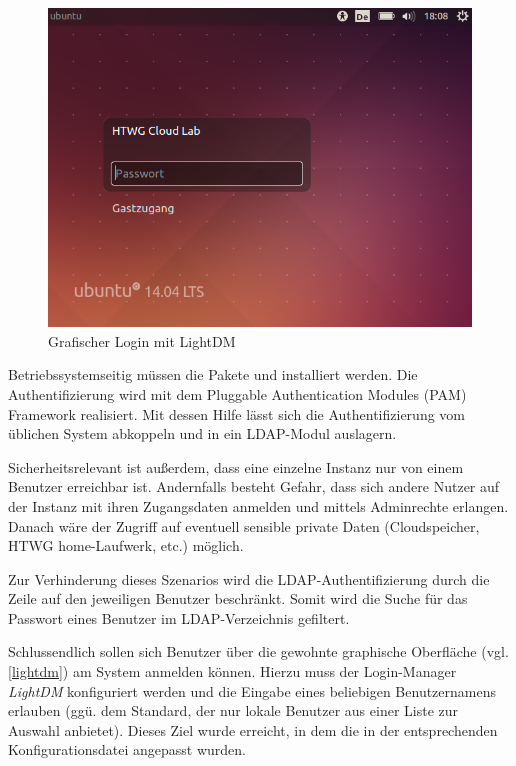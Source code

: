 \begin{figure}[htbp]
\centering
\includegraphics[scale=0.6]{img/lightdm.png}
\caption{Grafischer Login mit LightDM}
\label{lightdm}
\end{figure}

Betriebssystemseitig müssen die Pakete  und  installiert werden. 
Die Authentifizierung wird mit dem Pluggable Authentication Modules (PAM) Framework realisiert. 
Mit dessen Hilfe lässt sich die Authentifizierung vom üblichen System abkoppeln und in ein LDAP-Modul auslagern.

Sicherheitsrelevant ist außerdem, dass eine einzelne Instanz nur von einem Benutzer erreichbar ist. 
Andernfalls besteht Gefahr, dass sich andere Nutzer auf der Instanz mit ihren Zugangsdaten anmelden und mittels  Adminrechte erlangen.
Danach wäre der Zugriff auf eventuell sensible private Daten (Cloudspeicher, HTWG home-Laufwerk, etc.) möglich.

Zur Verhinderung dieses Szenarios wird die LDAP-Authentifizierung durch die Zeile   auf den jeweiligen Benutzer beschränkt.
Somit wird die Suche für das Passwort eines Benutzer im LDAP-Verzeichnis gefiltert.

Schlussendlich sollen sich Benutzer über die gewohnte graphische Oberfläche (vgl. \autoref{lightdm}) am System anmelden können.
Hierzu muss der Login-Manager \emph{LightDM} konfiguriert werden und die Eingabe eines beliebigen Benutzernamens erlauben (ggü. dem Standard, der nur lokale Benutzer aus einer Liste zur Auswahl anbietet).
Dieses Ziel wurde erreicht, in dem die  in der entsprechenden Konfigurationsdatei angepasst wurden.

